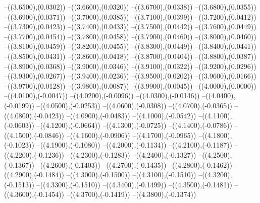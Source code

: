 {	--({\sx*(3.6500)},{\sy*(0.0302)})
	--({\sx*(3.6600)},{\sy*(0.0320)})
	--({\sx*(3.6700)},{\sy*(0.0338)})
	--({\sx*(3.6800)},{\sy*(0.0355)})
	--({\sx*(3.6900)},{\sy*(0.0371)})
	--({\sx*(3.7000)},{\sy*(0.0385)})
	--({\sx*(3.7100)},{\sy*(0.0399)})
	--({\sx*(3.7200)},{\sy*(0.0412)})
	--({\sx*(3.7300)},{\sy*(0.0423)})
	--({\sx*(3.7400)},{\sy*(0.0433)})
	--({\sx*(3.7500)},{\sy*(0.0442)})
	--({\sx*(3.7600)},{\sy*(0.0449)})
	--({\sx*(3.7700)},{\sy*(0.0454)})
	--({\sx*(3.7800)},{\sy*(0.0458)})
	--({\sx*(3.7900)},{\sy*(0.0460)})
	--({\sx*(3.8000)},{\sy*(0.0460)})
	--({\sx*(3.8100)},{\sy*(0.0459)})
	--({\sx*(3.8200)},{\sy*(0.0455)})
	--({\sx*(3.8300)},{\sy*(0.0449)})
	--({\sx*(3.8400)},{\sy*(0.0441)})
	--({\sx*(3.8500)},{\sy*(0.0431)})
	--({\sx*(3.8600)},{\sy*(0.0418)})
	--({\sx*(3.8700)},{\sy*(0.0404)})
	--({\sx*(3.8800)},{\sy*(0.0387)})
	--({\sx*(3.8900)},{\sy*(0.0368)})
	--({\sx*(3.9000)},{\sy*(0.0346)})
	--({\sx*(3.9100)},{\sy*(0.0322)})
	--({\sx*(3.9200)},{\sy*(0.0296)})
	--({\sx*(3.9300)},{\sy*(0.0267)})
	--({\sx*(3.9400)},{\sy*(0.0236)})
	--({\sx*(3.9500)},{\sy*(0.0202)})
	--({\sx*(3.9600)},{\sy*(0.0166)})
	--({\sx*(3.9700)},{\sy*(0.0128)})
	--({\sx*(3.9800)},{\sy*(0.0087)})
	--({\sx*(3.9900)},{\sy*(0.0045)})
	--({\sx*(4.0000)},{\sy*(0.0000)})
	--({\sx*(4.0100)},{\sy*(-0.0047)})
	--({\sx*(4.0200)},{\sy*(-0.0096)})
	--({\sx*(4.0300)},{\sy*(-0.0146)})
	--({\sx*(4.0400)},{\sy*(-0.0199)})
	--({\sx*(4.0500)},{\sy*(-0.0253)})
	--({\sx*(4.0600)},{\sy*(-0.0308)})
	--({\sx*(4.0700)},{\sy*(-0.0365)})
	--({\sx*(4.0800)},{\sy*(-0.0423)})
	--({\sx*(4.0900)},{\sy*(-0.0483)})
	--({\sx*(4.1000)},{\sy*(-0.0542)})
	--({\sx*(4.1100)},{\sy*(-0.0603)})
	--({\sx*(4.1200)},{\sy*(-0.0664)})
	--({\sx*(4.1300)},{\sy*(-0.0725)})
	--({\sx*(4.1400)},{\sy*(-0.0786)})
	--({\sx*(4.1500)},{\sy*(-0.0846)})
	--({\sx*(4.1600)},{\sy*(-0.0906)})
	--({\sx*(4.1700)},{\sy*(-0.0965)})
	--({\sx*(4.1800)},{\sy*(-0.1023)})
	--({\sx*(4.1900)},{\sy*(-0.1080)})
	--({\sx*(4.2000)},{\sy*(-0.1134)})
	--({\sx*(4.2100)},{\sy*(-0.1187)})
	--({\sx*(4.2200)},{\sy*(-0.1236)})
	--({\sx*(4.2300)},{\sy*(-0.1283)})
	--({\sx*(4.2400)},{\sy*(-0.1327)})
	--({\sx*(4.2500)},{\sy*(-0.1367)})
	--({\sx*(4.2600)},{\sy*(-0.1403)})
	--({\sx*(4.2700)},{\sy*(-0.1435)})
	--({\sx*(4.2800)},{\sy*(-0.1462)})
	--({\sx*(4.2900)},{\sy*(-0.1484)})
	--({\sx*(4.3000)},{\sy*(-0.1500)})
	--({\sx*(4.3100)},{\sy*(-0.1510)})
	--({\sx*(4.3200)},{\sy*(-0.1513)})
	--({\sx*(4.3300)},{\sy*(-0.1510)})
	--({\sx*(4.3400)},{\sy*(-0.1499)})
	--({\sx*(4.3500)},{\sy*(-0.1481)})
	--({\sx*(4.3600)},{\sy*(-0.1454)})
	--({\sx*(4.3700)},{\sy*(-0.1419)})
	--({\sx*(4.3800)},{\sy*(-0.1374)})
}
